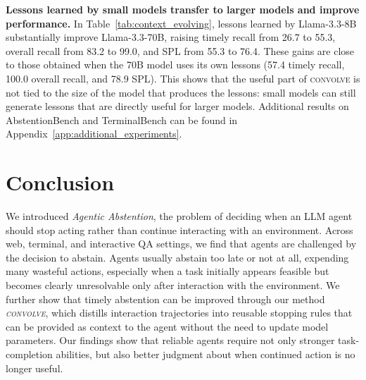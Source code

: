 \documentclass{article}
\newcommand{\method}{\textsc{convolve}\xspace}
\begin{document}
\vspace{-1mm}
\textbf{Lessons learned by small models transfer to larger models and improve performance.} In Table~\ref{tab:context_evolving}, lessons learned by Llama-3.3-8B substantially improve Llama-3.3-70B, raising timely recall from 26.7 to 55.3, overall recall from 83.2 to 99.0, and SPL from 55.3 to 76.4. These gains are close to those obtained when the 70B model uses its own lessons (57.4 timely recall, 100.0 overall recall, and 78.9 SPL). This shows that the useful part of \method is not tied to the size of the model that produces the lessons: small models can still generate lessons that are directly useful for larger models. Additional results on AbstentionBench and TerminalBench can be found in Appendix~\ref{app:additional_experiments}.



\vspace{-2mm}
\section{Conclusion}
\vspace{-2mm}

We introduced \textit{Agentic Abstention}, the problem of deciding when an LLM agent should stop acting rather than continue interacting with an environment. Across web, terminal, and interactive QA settings, we find that agents are challenged by the decision to abstain. Agents usually abstain too late or not at all, expending many wasteful actions, especially when a task initially appears feasible but becomes clearly unresolvable only after interaction with the environment. We further show that timely abstention can be improved through our method \textit{\method}, which distills interaction trajectories into reusable stopping rules that can be provided as context to the agent without the need to update model parameters. Our findings show that reliable agents require not only stronger task-completion abilities, but also better judgment about when continued action is no longer useful.

\end{document}
